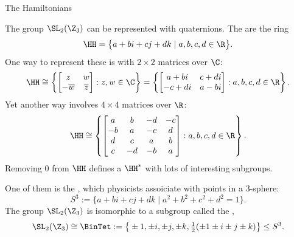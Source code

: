\documentclass[8pt, handout]{beamer}
\newcommand{\Pause}{}
\begin{document}

\begin{frame}{The Hamiltonians} %

  The group $\SL_2(\Z_3)$ can be represented with
  quaternions. \Pause The  are the ring
  \[
  \HH=\big\{a+bi+cj+dk\mid a,b,c,d\in\R\big\}.
  \]
  \Pause One way to represent these is with $2\times 2$ matrices over $\C$:
  \[
  \HH\cong\left\{
  \begin{bmatrix}z & w \\ -\overline{w} & \overline{z}\end{bmatrix}
  : z,w\in\C\right\}
  =\left\{\begin{bmatrix}a+bi & c+di \\ -c+di & a-bi\end{bmatrix}
  : a,b,c,d\in\R\right\}.
  \]
  \Pause Yet another way involves $4\times 4$ matrices over $\R$:
  \[
  \HH\cong\left\{\begin{bmatrix}
  a&b&-d&-c\\-b&a&-c&d\\d&c&a&b\\c&-d&-b&a\end{bmatrix}
  :a,b,c,d\in\R\right\}.
  \]
  \Pause Removing $0$ from $\HH$ defines a  $\HH^*$ with lots of interesting subgroups. \medskip\Pause
  
  One of them is the , which physicists
  assoiciate with points in a $3$-sphere:
  \[
  S^3:=\big\{a+bi+cj+dk\mid a^2+b^2+c^2+d^2=1\big\}.
  \]
  \Pause The group $\SL_2(\Z_3)$ is isomorphic to a subgroup called
  the ,
  \[
  \SL_2(\Z_3)\cong\BinTet:=\big\{\pm 1,\pm i,\pm j,\pm k,
  \tfrac{1}{2}(\pm 1\pm i\pm j\pm k)\big\}\leq S^3.
  \]
  
\end{frame}

\end{document}
